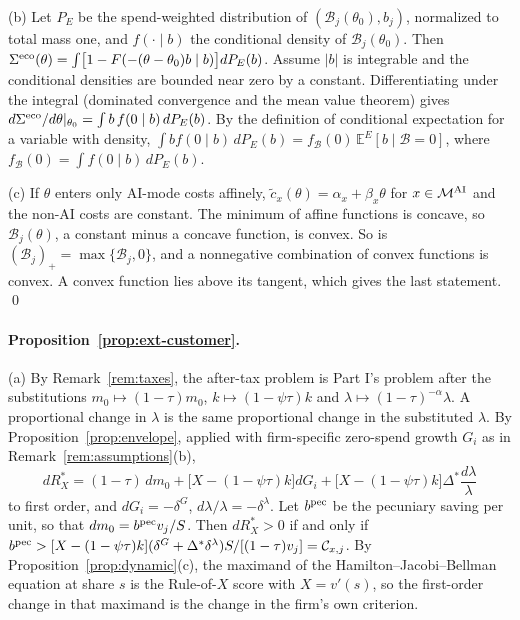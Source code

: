 (b) Let $P_E$ be the spend-weighted distribution of $(\mathcal B_j(\theta_0),b_j)$, normalized to total mass one, and $f(\cdot\mid b)$ the conditional density of $\mathcal B_j(\theta_0)$. Then $\Sigma^{\rm eco}(\theta)=\int\bigl[1-F(-(\theta-\theta_0)b\mid b)\bigr]dP_E(b)$. Assume $|b|$ is integrable and the conditional densities are bounded near zero by a constant. Differentiating under the integral (dominated convergence and the mean value theorem) gives $d\Sigma^{\rm eco}/d\theta|_{\theta_0}=\int b\,f(0\mid b)\,dP_E(b)$. By the definition of conditional expectation for a variable with density, $\int bf(0\mid b)\,dP_E(b)=f_{\mathcal B}(0)\,\mathbb E^E[b\mid\mathcal B=0]$, where $f_{\mathcal B}(0)=\int f(0\mid b)\,dP_E(b)$.

(c) If $\theta$ enters only AI-mode costs affinely, $\tilde c_x(\theta)=\alpha_x+\beta_x\theta$ for $x\in\mathcal M^{\rm AI}$ and the non-AI costs are constant. The minimum of affine functions is concave, so $\mathcal B_j(\theta)$, a constant minus a concave function, is convex. So is $(\mathcal B_j)_+=\max\{\mathcal B_j,0\}$, and a nonnegative combination of convex functions is convex. A convex function lies above its tangent, which gives the last statement. \qed

\paragraph{Proposition~\ref{prop:ext-customer}.} (a) By Remark~\ref{rem:taxes}, the after-tax problem is Part I's problem after the substitutions $m_0\mapsto(1-\tau)m_0$, $k\mapsto(1-\psi\tau)k$ and $\lambda\mapsto(1-\tau)^{-\alpha}\lambda$. A proportional change in $\lambda$ is the same proportional change in the substituted $\lambda$. By Proposition~\ref{prop:envelope}, applied with firm-specific zero-spend growth $G_i$ as in Remark~\ref{rem:assumptions}(b),
\[
dR_X^*=(1-\tau)\,dm_0+\bigl[X-(1-\psi\tau)k\bigr]dG_i+\bigl[X-(1-\psi\tau)k\bigr]\Delta^*\frac{d\lambda}{\lambda}
\]
to first order, and $dG_i=-\delta^G$, $d\lambda/\lambda=-\delta^\lambda$. Let $b^{\rm pec}$ be the pecuniary saving per unit, so that $dm_0=b^{\rm pec}v_j/S$. Then $dR_X^*>0$ if and only if $b^{\rm pec}>[X-(1-\psi\tau)k](\delta^G+\Delta^*\delta^\lambda)S/[(1-\tau)v_j]=\mathcal C_{x,j}$. By Proposition~\ref{prop:dynamic}(c), the maximand of the Hamilton--Jacobi--Bellman equation at share $s$ is the Rule-of-$X$ score with $X=v'(s)$, so the first-order change in that maximand is the change in the firm's own criterion.

